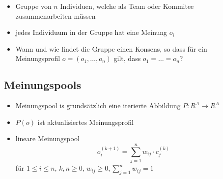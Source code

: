 \begin{itemize}
	\item Gruppe von $n$ Individuen, welche als Team oder Kommitee zusammenarbeiten müssen
	\item jedes Individuum in der Gruppe hat eine Meinung $o_i$
	\item Wann und wie findet die Gruppe einen Konsens, so dass für ein Meinungsprofil $o=(o_1,\dots,o_n)$ gilt, dass $o_1=\dots=o_n$?
\end{itemize}
\subsection{Meinungspools}
\begin{itemize}
	\item Meinungspool is grundsätzlich eine iterierte Abbildung $P:R^A\rightarrow R^A$
	\item $P(o)$ ist aktualisiertes Meinungsprofil
	\item lineare Meinungspool
		\[o_i^{(k+1)}=\sum\limits_{j=1}^n w_{ij}\cdot c_j^{(k)}\]
		für $1\leq i\leq n$, $k,n\geq 0$, $w_{ij}\geq 0, \sum\limits_{j=1}^n w_{ij}=1$
\end{itemize}